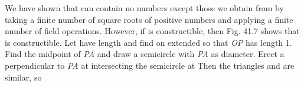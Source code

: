 \documentclass[11pt,oneside]{article}
\begin{document}
\begin{BookBody}
 We have shown that  can contain no numbers except those we obtain from  by taking a finite number of square roots of positive numbers and applying a finite number 
of field operations. However, if  is constructible, then Fig. 41.7 shows that \BookInline{\sqrt{\alpha }} is constructible. Let  have length \BookInline{\alpha,\allowbreak } and find  on  extended so that\textit{ OP} has length 1. Find the midpoint of\textit{ PA} and draw a semicircle with\textit{ PA} as diameter. Erect a perpendicular to\textit{ PA} at  intersecting the semicircle at  Then the triangles  and  are similar, so

\end{BookBody}

\BookNarrativetrue
\end{document}
